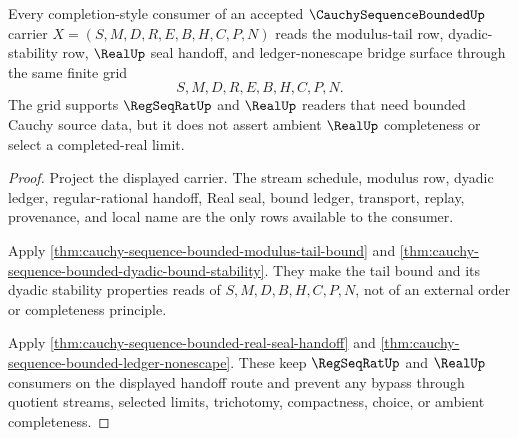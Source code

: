 
\begin{theorem}
\label{thm:cauchy-sequence-bounded-mature-consumer-grid}
Every completion-style consumer of an accepted $\CauchySequenceBoundedUp$ carrier $X=(S,M,D,R,E,B,H,C,P,N)$ reads the modulus-tail row, dyadic-stability row, $\RealUp$ seal handoff, and ledger-nonescape bridge surface through the same finite grid
$$
S,M,D,R,E,B,H,C,P,N.
$$
The grid supports $\RegSeqRatUp$ and $\RealUp$ readers that need bounded Cauchy source data, but it does not assert ambient $\RealUp$ completeness or select a completed-real limit.
\end{theorem}
\begin{proof}
Project the displayed carrier. The stream schedule, modulus row, dyadic ledger, regular-rational handoff, Real seal, bound ledger, transport, replay, provenance, and local name are the only rows available to the consumer.

Apply \autoref{thm:cauchy-sequence-bounded-modulus-tail-bound} and \autoref{thm:cauchy-sequence-bounded-dyadic-bound-stability}. They make the tail bound and its dyadic stability properties reads of $S,M,D,B,H,C,P,N$, not of an external order or completeness principle.

Apply \autoref{thm:cauchy-sequence-bounded-real-seal-handoff} and \autoref{thm:cauchy-sequence-bounded-ledger-nonescape}. These keep $\RegSeqRatUp$ and $\RealUp$ consumers on the displayed handoff route and prevent any bypass through quotient streams, selected limits, trichotomy, compactness, choice, or ambient completeness.
\end{proof}

